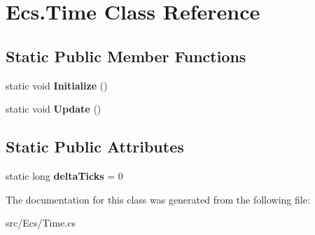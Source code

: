 \hypertarget{class_ecs_1_1_time}{}\section{Ecs.\+Time Class Reference}
\label{class_ecs_1_1_time}
\subsection*{Static Public Member Functions}
\begin{DoxyCompactItemize}
\item 
\mbox{\label{class_ecs_1_1_time_a435837193cce74947d0fc63b6f14f36f}} 
static void {\bfseries Initialize} ()
\item 
\mbox{\label{class_ecs_1_1_time_a7d98fab0c7c708ea1f1adab0af3a7a7f}} 
static void {\bfseries Update} ()
\end{DoxyCompactItemize}
\subsection*{Static Public Attributes}
\begin{DoxyCompactItemize}
\item 
\mbox{\label{class_ecs_1_1_time_a149d65fe7eb9f87c12cbd846af94578f}} 
static long {\bfseries delta\+Ticks} = 0
\end{DoxyCompactItemize}


The documentation for this class was generated from the following file\+:\begin{DoxyCompactItemize}
\item 
src/\+Ecs/Time.\+cs\end{DoxyCompactItemize}
